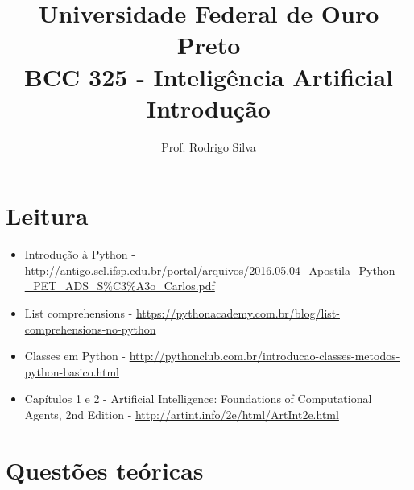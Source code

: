\documentclass{article}
\title{\vspace{-2 cm}Universidade Federal de Ouro Preto \\ BCC 325 - Inteligência Artificial \\ Introdução}
\author{Prof. Rodrigo Silva}
\date{}
\begin{document}
\maketitle



\section{Leitura}

\begin{itemize}
    \item Introdução à Python - \url{http://antigo.scl.ifsp.edu.br/portal/arquivos/2016.05.04_Apostila\_Python\_-\_PET\_ADS\_S\%C3\%A3o_Carlos.pdf}
    \item List comprehensions - \url{https://pythonacademy.com.br/blog/list-comprehensions-no-python}
    \item Classes em Python - \url{http://pythonclub.com.br/introducao-classes-metodos-python-basico.html}
    \item Capítulos 1 e 2 - Artificial Intelligence: Foundations of Computational Agents,  2nd Edition - \url{http://artint.info/2e/html/ArtInt2e.html}
\end{itemize}


\section{Questões teóricas}
\end{document}
